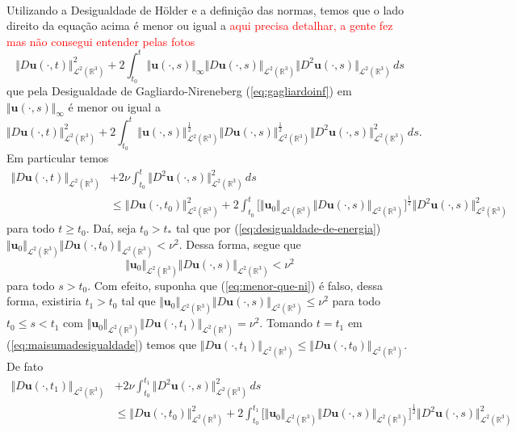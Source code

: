 \documentclass[a4paper, 11pt]{book}
\theoremstyle{definition}
\newcommand{\bR}{\mathbb{R}}
\newcommand{\bu}{\mathbf{u}}
\newcommand{\cL}{\mathcal{L}}
\begin{document}
\begin{prf}
\[\begin{aligned}
        \end{aligned}
    \]
    Utilizando a Desigualdade de Hölder e a definição das normas, temos que o lado direito da equação acima é menor ou igual a \textcolor{red}{aqui precisa detalhar, a gente fez mas não consegui entender pelas fotos}
    \[
        \Vert D\bu(\cdot,t) \Vert_{\cL^2(\bR^3)}^2 + 2 \! \int_{t_0}^t \Vert \bu(\cdot,s) \Vert_{\infty} \Vert D\bu(\cdot,s) \Vert_{\cL^2(\bR^3)} \Vert D^2\bu(\cdot,s) \Vert_{\cL^2(\bR^3)} \,ds
    \]
    que pela Desigualdade de Gagliardo-Nireneberg (\ref{eq:gagliardoinf}) em $\Vert \bu(\cdot,s) \Vert_{\infty}$ é menor ou igual a
    \[
        \Vert D\bu(\cdot,t) \Vert_{\cL^2(\bR^3)}^2 + 2 \! \int_{t_0}^t \Vert \bu(\cdot,s) \Vert_{\cL^2(\bR^3)}^{\frac{1}{2}} \Vert D\bu(\cdot,s) \Vert_{\cL^2(\bR^3)}^{\frac{1}{2}} \Vert D^2\bu(\cdot,s) \Vert_{\cL^2(\bR^3)}^2 \,ds.
    \]
    Em particular temos
    \begin{equation} \label{eq:maisumadesigualdade}
        \begin{aligned}
            \Vert D\bu(\cdot,t) \Vert_{\cL^2(\bR^3)} &+ 2 \nu \int_{t_0}^t \Vert D^2 \bu(\cdot,s) \Vert_{\cL^2(\bR^3)}^2 \,ds\\ &\leqslant \Vert D\bu(\cdot,t_0) \Vert_{\cL^2(\bR^3)}^2 + 2 \! \int_{t_0}^t \big[ \Vert \bu_0 \Vert_{\cL^2(\bR^3)} \Vert D\bu(\cdot,s) \Vert_{\cL^2(\bR^3)} \big]^\frac{1}{2} \Vert D^2\bu(\cdot,s) \Vert_{\cL^2(\bR^3)}^2
        \end{aligned}
    \end{equation}
    para todo $t \geqslant t_0$. Daí, seja $t_0 > t_*$ tal que por (\ref{eq:desigualdade-de-energia}) $\Vert \bu_0 \Vert_{\cL^2(\bR^3)} \Vert D\bu(\cdot,t_0 ) \Vert_{\cL^2(\bR^3)} < \nu^2$.
    Dessa forma, segue que
    \begin{equation} \label{eq:menor-que-ni}
        \Vert \bu_0 \Vert_{\cL^2(\bR^3)} \Vert D\bu(\cdot,s) \Vert_{\cL^2(\bR^3)} < \nu^2
    \end{equation}
    para todo $s > t_0$.
    Com efeito, suponha que (\ref{eq:menor-que-ni}) é falso, dessa forma, existiria $t_1 > t_0$ tal que $\Vert \bu_0  \Vert_{\cL^2(\bR^3)} \Vert D\bu(\cdot,s) \Vert_{\cL^2(\bR^3)} \leqslant \nu^2$ para todo $t_0 \leqslant s < t_1$ com $\Vert \bu_0  \Vert_{\cL^2(\bR^3)} \Vert D\bu(\cdot,t_1) \Vert_{\cL^2(\bR^3)} = \nu^2$. Tomando $t = t_1$ em (\ref{eq:maisumadesigualdade}) temos que $\Vert D\bu(\cdot,t_1) \Vert_{\cL^2(\bR^3)} \leqslant \Vert D\bu(\cdot,t_0) \Vert_{\cL^2(\bR^3)}$. De fato
    \[
        \begin{aligned}
            \Vert D\bu(\cdot,t_1) \Vert_{\cL^2(\bR^3)} &+ 2 \nu \int_{t_0}^{t_1} \Vert D^2 \bu(\cdot,s) \Vert_{\cL^2(\bR^3)}^2 \,ds\\ &\leqslant \Vert D\bu(\cdot,t_0) \Vert_{\cL^2(\bR^3)}^2 + 2 \! \int_{t_0}^{t_1} \big[ \Vert \bu_0 \Vert_{\cL^2(\bR^3)} \Vert D\bu(\cdot,s) \Vert_{\cL^2(\bR^3)} \big]^\frac{1}{2} \Vert D^2\bu(\cdot,s) \Vert_{\cL^2(\bR^3)}^2

\end{aligned}\]
\end{prf}
\end{document}

